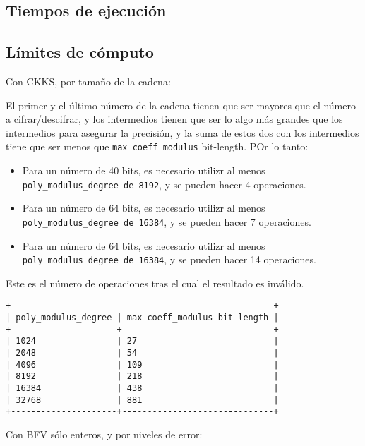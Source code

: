 \subsection{Tiempos de ejecución}

\subsection{Límites de cómputo}

Con CKKS, por tamaño de la cadena:

El primer y el último número de la cadena tienen que ser mayores que el número a cifrar/descifrar, y los intermedios tienen que ser lo algo más grandes  que los intermedios para asegurar la precisión, y la suma de estos dos con los intermedios tiene que ser menos que  \verb|max coeff_modulus| bit-length. POr lo tanto:

\begin{itemize}
    \item Para un número de 40 bits, es necesario utilizr al menos  \verb|poly_modulus_degree de 8192|, y se pueden hacer 4 operaciones.
    \item Para un número de 64 bits, es necesario utilizr al menos  \verb|poly_modulus_degree de 16384|, y se pueden hacer 7 operaciones.
    \item Para un número de 64 bits, es necesario utilizr al menos \verb|poly_modulus_degree de 16384|, y se pueden hacer 14 operaciones.
\end{itemize}

Este es el número de operaciones tras el cual el resultado es inválido.

\begin{lstlisting}
+----------------------------------------------------+
| poly_modulus_degree | max coeff_modulus bit-length |
+---------------------+------------------------------+
| 1024                | 27                           |
| 2048                | 54                           |
| 4096                | 109                          |
| 8192                | 218                          |
| 16384               | 438                          |
| 32768               | 881                          |
+---------------------+------------------------------+
\end{lstlisting}

Con BFV sólo enteros, y por niveles de error:
